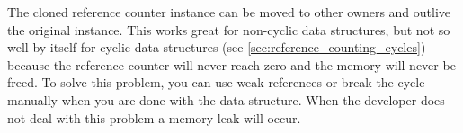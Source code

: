 The cloned reference counter instance can be moved to other owners and outlive the original instance.
This works great for non-cyclic data structures, but not so well by itself for cyclic data structures
(see \autoref{sec:reference_counting_cycles}) because the reference counter will never reach zero
and the memory will never be freed.
To solve this problem, you can use weak references \cite[334-335]{rust_book_2019} or break the cycle manually
when you are done with the data structure.
When the developer does not deal with this problem a memory leak will occur.


